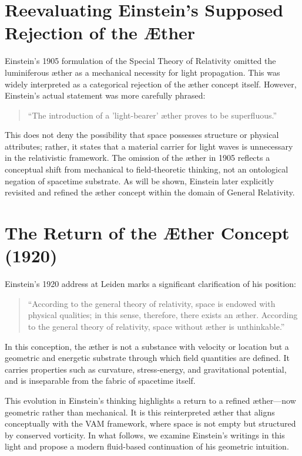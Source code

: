 \documentclass[preprint]{revtex4-2}
\begin{document}
\vspace{1em}

\section{Reevaluating Einstein’s Supposed Rejection of the Æther}

Einstein’s 1905 formulation of the Special Theory of Relativity omitted the luminiferous æther as a mechanical necessity for light propagation. This was widely interpreted as a categorical rejection of the æther concept itself. However, Einstein’s actual statement was more carefully phrased:

\begin{quote}
    ``The introduction of a 'light-bearer' æther proves to be superfluous.''
\end{quote}

This does not deny the possibility that space possesses structure or physical attributes; rather, it states that a material carrier for light waves is unnecessary in the relativistic framework. The omission of the æther in 1905 reflects a conceptual shift from mechanical to field-theoretic thinking, not an ontological negation of spacetime substrate. As will be shown, Einstein later explicitly revisited and refined the æther concept within the domain of General Relativity.

\section{The Return of the Æther Concept (1920)}

Einstein’s 1920 address at Leiden marks a significant clarification of his position:

\begin{quote}
    ``According to the general theory of relativity, space is endowed with physical qualities; in this sense, therefore, there exists an æther. According to the general theory of relativity, space without æther is unthinkable.''~\cite{einstein1920aether}
\end{quote}

In this conception, the æther is not a substance with velocity or location but a geometric and energetic substrate through which field quantities are defined. It carries properties such as curvature, stress-energy, and gravitational potential, and is inseparable from the fabric of spacetime itself.

This evolution in Einstein's thinking highlights a return to a refined æther—now geometric rather than mechanical. It is this reinterpreted æther that aligns conceptually with the VAM framework, where space is not empty but structured by conserved vorticity. In what follows, we examine Einstein’s writings in this light and propose a modern fluid-based continuation of his geometric intuition.
\end{document}
